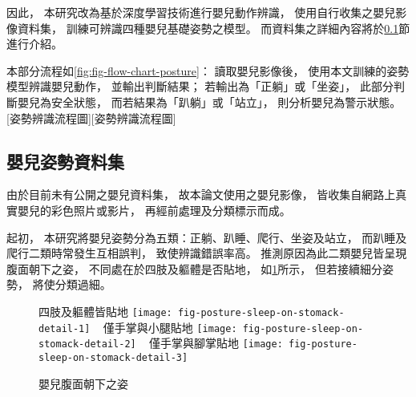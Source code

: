 \documentclass[class=NCU_thesis, crop=false]{standalone}
\begin{document}
因此，
本研究改為基於深度學習技術進行嬰兒動作辨識，
使用自行收集之嬰兒影像資料集，
訓練可辨識四種嬰兒基礎姿勢之模型。
而資料集之詳細內容將於\ref{sec:chapter_method_posture_dataset}節進行介紹。

本部分流程如\cref{fig:fig-flow-chart-posture}：
讀取嬰兒影像後，
使用本文訓練的姿勢模型辨識嬰兒動作，
並輸出判斷結果；
若輸出為「正躺」或「坐姿」，
此部分判斷嬰兒為安全狀態，
而若結果為「趴躺」或「站立」，
則分析嬰兒為警示狀態。
[姿勢辨識流程圖][姿勢辨識流程圖]

\subsection{嬰兒姿勢資料集}
\label{sec:chapter_method_posture_dataset}
由於目前未有公開之嬰兒資料集，
故本論文使用之嬰兒影像，
皆收集自網路上真實嬰兒的彩色照片或影片，
再經前處理及分類標示而成。

起初，
本研究將嬰兒姿勢分為五類：正躺、趴睡、爬行、坐姿及站立，
而趴睡及爬行二類時常發生互相誤判，
致使辨識錯誤率高。
推測原因為此二類嬰兒皆呈現腹面朝下之姿，
不同處在於四肢及軀體是否貼地，
如\cref{fig:fig-posture-sleep-on-stomack-detail}所示，
但若接續細分姿勢，
將使分類過細。
\begin{figure}[!hbt]
    \centering
    \subcaptionbox
        {四肢及軀體皆貼地
        \label{fig:fig-posture-sleep-on-stomack-detail-1}}
        {\texttt{[image: fig-posture-sleep-on-stomack-detail-1]}}
    ~
    \subcaptionbox
        {僅手掌與小腿貼地
        \label{fig:fig-posture-sleep-on-stomack-detail-2}}
        {\texttt{[image: fig-posture-sleep-on-stomack-detail-2]}}
    ~
    \subcaptionbox
        {僅手掌與腳掌貼地
        \label{fig:fig-posture-sleep-on-stomack-detail-3}}
        {\texttt{[image: fig-posture-sleep-on-stomack-detail-3]}}
    \caption{嬰兒腹面朝下之姿}
    \label{fig:fig-posture-sleep-on-stomack-detail}
\end{figure}
\end{document}
